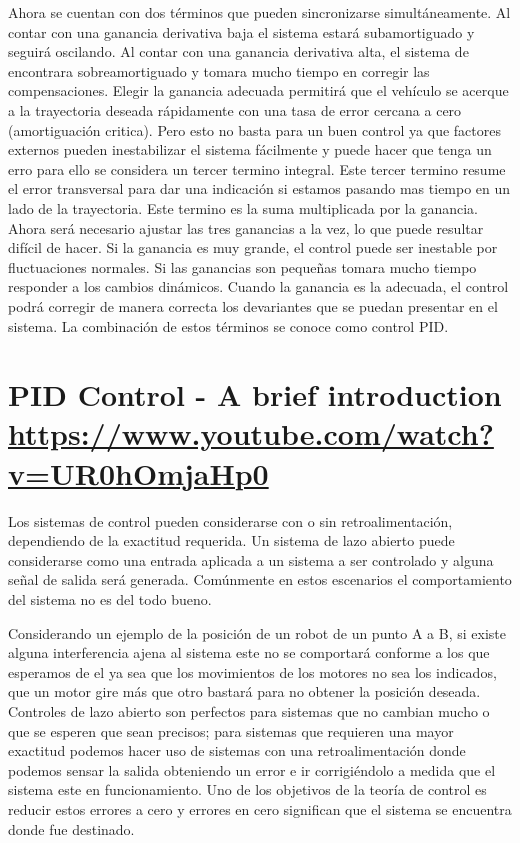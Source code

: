 \documentclass[
	12pt, %
]{fphw}
\begin{document}
Ahora se cuentan con dos términos que pueden sincronizarse simultáneamente. 
Al contar con una ganancia derivativa baja el sistema estará subamortiguado y seguirá oscilando.
Al contar con una ganancia derivativa alta, el sistema de encontrara sobreamortiguado y tomara mucho tiempo en corregir las compensaciones.
Elegir la ganancia adecuada permitirá que el vehículo se acerque a la trayectoria deseada rápidamente con una tasa de error cercana a cero (amortiguación critica). Pero esto no basta para un buen control ya que factores externos pueden inestabilizar el sistema fácilmente y puede hacer que tenga un erro para ello se considera un tercer termino integral.
Este tercer termino resume el error transversal para dar una indicación si estamos pasando mas tiempo en un lado de la trayectoria. Este termino es la suma multiplicada por la ganancia.
Ahora será necesario ajustar las tres ganancias a la vez, lo que puede resultar difícil de hacer.
Si la ganancia es muy grande, el control puede ser inestable por fluctuaciones normales.
Si las ganancias son pequeñas tomara mucho tiempo responder a los cambios dinámicos.
Cuando la ganancia es la adecuada, el control podrá corregir de manera correcta los devariantes que se puedan presentar en el sistema.
La combinación de estos términos se conoce como control PID.



\newpage
\section*{{\color{RoyalPurple}PID Control - A brief introduction} \url{https://www.youtube.com/watch?v=UR0hOmjaHp0}}

Los sistemas de control pueden considerarse con o sin retroalimentación, dependiendo de la exactitud requerida. Un sistema de lazo abierto puede considerarse como una entrada aplicada a un sistema a ser controlado y alguna señal de salida será generada. Comúnmente en estos escenarios el comportamiento del sistema no es del todo bueno.

Considerando un ejemplo de la posición de un robot de un punto A a B, si existe alguna interferencia ajena al sistema este no se comportará conforme a los que esperamos de el ya sea que los movimientos de los motores no sea los indicados, que un motor gire más que otro bastará para no obtener la posición deseada. Controles de lazo abierto son perfectos para sistemas que no cambian mucho o que se esperen que sean precisos; para sistemas que requieren una mayor exactitud podemos hacer uso de sistemas con una retroalimentación donde podemos sensar la salida obteniendo un error e ir corrigiéndolo a medida que el sistema este en funcionamiento. Uno de los objetivos de la teoría de control es reducir estos errores a cero y errores en cero significan que el sistema se encuentra donde fue destinado.
\end{document}
